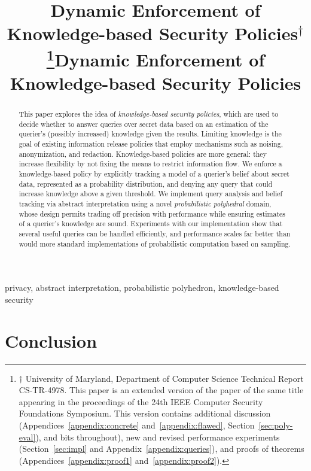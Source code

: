 \documentclass[10pt,conference,compsocconf]{IEEEtran}
\title{Dynamic Enforcement of Knowledge-based Security
  Policies{\Large $ ^\dagger$}\thanks{$\dagger$ University of Maryland, Department of Computer
    Science Technical Report CS-TR-4978.  This paper is an extended
    version of the paper
    of the same title appearing in the proceedings of the 24th IEEE
    Computer Security Foundations Symposium.  This version contains
    additional discussion (Appendices~\ref{appendix:concrete}
    and~\ref{appendix:flawed}, Section~\ref{sec:poly-eval}), and bits
    throughout), new and revised 
    performance experiments (Section~\ref{sec:impl} and 
    Appendix~\ref{appendix:queries}), and proofs of
    theorems (Appendices~\ref{appendix:proof1}
    and~\ref{appendix:proof2}).}}
\title{Dynamic Enforcement of Knowledge-based Security Policies}
\author{\IEEEauthorblockN{Piotr Mardziel, Stephen Magill, Michael Hicks}
\IEEEauthorblockA{University of Maryland, College Park}
\and
\IEEEauthorblockN{Mudhakar Srivatsa}
\IEEEauthorblockA{IBM T.J. Watson Research Laboratory}}
\begin{document}
\pagestyle{plain}


\maketitle
\date{}

\begin{abstract}
  This paper explores the idea of \emph{knowledge-based security
    policies}, which are used to decide whether to answer queries over
  secret data based on an estimation of the querier's (possibly
  increased) knowledge given the results.  Limiting knowledge is the
  goal of existing information release policies that employ mechanisms
  such as noising, anonymization, and redaction.  Knowledge-based
  policies are more general: they increase flexibility by not fixing
  the means to restrict information flow.  We enforce a
  knowledge-based policy by explicitly tracking a model of a querier's
  belief about secret data, represented as a probability distribution,
  and denying any query that could increase knowledge above a given
  threshold.  We implement query analysis and belief tracking via
  abstract interpretation using a novel 
  \emph{probabilistic polyhedral} domain, whose design permits trading off
  precision with performance while ensuring estimates of a querier's
  knowledge are sound.  Experiments with our implementation show that
  several useful queries can be handled efficiently, and performance
  scales far better than would more standard implementations of
  probabilistic computation based on sampling.
\end{abstract}

\iffull
\else
\ifacita
\else
\begin{IEEEkeywords}
privacy, abstract interpretation, probabilistic polyhedron,
knowledge-based security
\end{IEEEkeywords}
\fi \fi









\section{Conclusion}
\label{sec:conc}
\end{document}
